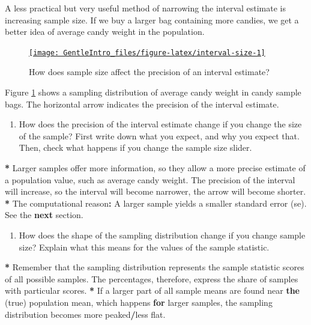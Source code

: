 \documentclass[a4paper]{book}
\newenvironment{Shaded}{\begin{snugshade}}{\end{snugshade}}
\newcommand{\KeywordTok}[1]{\textcolor[rgb]{0,0,0}{\textbf{#1}}}
\newcommand{\StringTok}[1]{\textcolor[rgb]{0.00,0.00,0.00}{#1}}
\newcommand{\ControlFlowTok}[1]{\textcolor[rgb]{0.00,0.00,0.00}{\textbf{#1}}}
\newcommand{\OperatorTok}[1]{\textcolor[rgb]{0.00,0.00,0.00}{\textbf{#1}}}
\newcommand{\NormalTok}[1]{#1}
\providecommand{\tightlist}{%
  \setlength{\itemsep}{0pt}\setlength{\parskip}{0pt}}
\theoremstyle{definition}
\theoremstyle{definition}
\theoremstyle{definition}
\theoremstyle{remark}
\begin{document}
A less practical but very useful method of narrowing the interval
estimate is increasing sample size. If we buy a larger bag containing
more candies, we get a better idea of average candy weight in the
population.

\begin{figure}[H]
\href{http://82.196.4.233:3838/apps/interval-size/}{\texttt{[image: GentleIntro\_files/figure-latex/interval-size-1]} }\caption{How does sample size affect the precision of an interval estimate?}\label{fig:interval-size}
\end{figure}

Figure \ref{fig:interval-size} shows a sampling distribution of average
candy weight in candy sample bags. The horizontal arrow indicates the
precision of the interval estimate.

\begin{enumerate}
\def\labelenumi{\arabic{enumi}.}
\tightlist
\item
  How does the precision of the interval estimate change if you change
  the size of the sample? First write down what you expect, and why you
  expect that. Then, check what happens if you change the sample size
  slider.
\end{enumerate}

\begin{Shaded}
\begin{Highlighting}[]
\OperatorTok{*}\StringTok{ }\NormalTok{Larger samples offer more information, so they allow a more precise estimate}
\NormalTok{of a population value, such as average candy weight. The precision of the}
\NormalTok{interval will increase, so the interval will become narrower, the arrow will}
\NormalTok{become shorter.}
\OperatorTok{*}\StringTok{ }\NormalTok{The computational reason}\OperatorTok{:}\StringTok{ }\NormalTok{A larger sample yields a smaller standard error}
\NormalTok{(se). See the }\ControlFlowTok{next}\NormalTok{ section.}
\end{Highlighting}
\end{Shaded}

\begin{enumerate}
\def\labelenumi{\arabic{enumi}.}
\setcounter{enumi}{1}
\tightlist
\item
  How does the shape of the sampling distribution change if you change
  sample size? Explain what this means for the values of the sample
  statistic.
\end{enumerate}

\begin{Shaded}
\begin{Highlighting}[]
\OperatorTok{*}\StringTok{ }\NormalTok{Remember that the sampling distribution represents the sample statistic}
\NormalTok{scores of all possible samples. The percentages, therefore, express the share}
\NormalTok{of samples with particular scores.}
\OperatorTok{*}\StringTok{ }\NormalTok{If a larger part of all sample means are found near }\KeywordTok{the}\NormalTok{ (true) population}
\NormalTok{mean, which happens }\ControlFlowTok{for}\NormalTok{ larger samples, the sampling distribution becomes more}
\NormalTok{peaked}\OperatorTok{/}\NormalTok{less flat.}
\end{Highlighting}
\end{Shaded}
\end{document}
